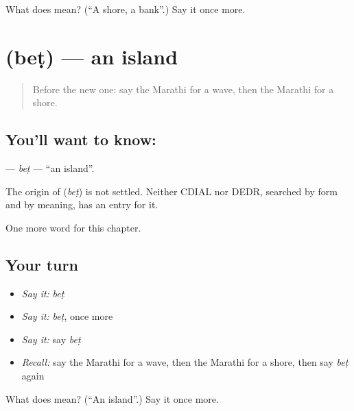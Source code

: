 \begin{tcolorbox}[breakable,colback=teal!4,colframe=teal!35!black,title={Before you move on}]
What does  mean? (\textquotedblleft{}A shore, a bank\textquotedblright{}.) Say it once more.
\end{tcolorbox}
\section[\texorpdfstring{\mr{बेट} (beṭ)}{बेट (beṭ)}]{ (beṭ) — an island}

\label{lesson:MR-C141-bet}



\begin{quote}
Before the new one: say the Marathi for a wave, then the Marathi for a shore.
\end{quote}

\subsection*{You'll want to know: }
\textbf{} — \emph{beṭ} — \textquotedblleft{}an island\textquotedblright{}.

\begin{cousinweb}
The origin of \textbf{} (\emph{beṭ}) is not settled. Neither CDIAL nor DEDR, searched by form and by meaning, has an entry for it.
\end{cousinweb}

\begin{grammarlens}[title={What you've built}]
One more word for this chapter.
\end{grammarlens}

\subsection*{Your turn}
\begin{itemize}
\raggedright
  \item \emph{Say it:} \emph{beṭ}
  \item \emph{Say it:} \emph{beṭ}, once more
  \item \emph{Say it:} say \emph{beṭ}
  \item \emph{Recall:} say the Marathi for a wave, then the Marathi for a shore, then say \emph{beṭ} again
\end{itemize}

\begin{tcolorbox}[breakable,colback=teal!4,colframe=teal!35!black,title={Before you move on}]
What does  mean? (\textquotedblleft{}An island\textquotedblright{}.) Say it once more.
\end{tcolorbox}
